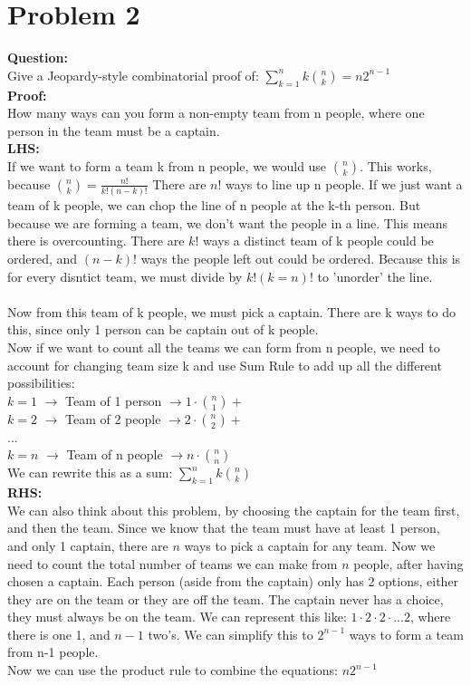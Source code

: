 \documentclass[11pt]{article}
\begin{document}
\section*{Problem 2}

\textbf{Question: }\\
Give a Jeopardy-style combinatorial proof of: $\sum_{k=1}^{n}k\binom{n}{k} = n2^{n-1}$
\\\textbf{Proof: }\\
How many ways can you form a non-empty team from {n} people, where one person in the team must be a captain.
\\\textbf{LHS: }\\
If we want to form a team {k} from {n} people, we would use $\binom{n}{k}$. This works, because $\binom{n}{k}=\frac{n!}{k!(n-k)!}$ There are $n!$ ways to line up {n} people. If we just want a team of {k} people, we can chop the line of {n} people at the {k}-th person. But because we are forming a team, we don't want the people in a line. This means there is overcounting. There are $k!$ ways a distinct team of k people could be ordered, and $(n-k)!$ ways the people left out could be ordered. Because this is for every disntict team, we must divide by $k!(k=n)!$ to 'unorder' the line.
\\\\Now from this team of {k} people, we must pick a captain. There are {k} ways to do this, since only 1 person can be captain out of {k} people.
\\Now if we want to count all the teams we can form from {n} people, we need to account for changing team size {k} and use Sum Rule to add up all the different possibilities:
\\$k = 1$ $\rightarrow$ Team of 1 person $\rightarrow 1 \cdot \binom{n}{1} +$
\\$k = 2$ $\rightarrow$ Team of 2 people $\rightarrow 2 \cdot \binom{n}{2} +$
\\ ...
\\$k = n$ $\rightarrow$ Team of {n} people $\rightarrow n \cdot \binom{n}{n}$
\\We can rewrite this as a sum: $\sum_{k=1}^{n}k\binom{n}{k} $
\\\textbf{RHS: }\\
We can also think about this problem, by choosing the captain for the team first, and then the team. Since we know that the team must have at least 1 person, and only 1 captain, there are $n$ ways to pick a captain for any team. Now we need to count the total number of teams we can make from $n$ people, after having chosen a captain. Each person (aside from the captain) only has 2 options, either they are on the team or they are off the team. The captain never has a choice, they must always be on the team. We can represent this like: $1 \cdot 2 \cdot 2 \cdot ... 2$, where there is one 1, and $n-1$ two's. We can simplify this to $2^{n-1}$ ways to form a team from n-1 people. 
\\Now we can use the product rule to combine the equations: $n2^{n-1}$
\end{document}
